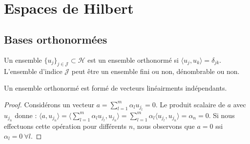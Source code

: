 \section{Espaces de Hilbert}


\subsection{Bases orthonormées}

\begin{definition}
    Un ensemble $\{u_j\}_{j\in\mathcal{J}}\subset\mathcal{H}$ est un ensemble orthonormé si $\langle u_j,u_k \rangle = \delta_{jk}$. L'ensemble d'indice $\mathcal{J}$ peut être un ensemble fini ou non, dénombrable ou non.
    
    Un ensemble orthonormé est formé de vecteurs linéairments indépendants.
\end{definition}
\begin{proof}
    Considérons un vecteur $a = \sum \limits_{l=1}^m \alpha_lu_{j_l} = 0$. Le produit scalaire de $a$ avec $u_{j_n}$ donne : $\langle a,u_{j_n} \rangle = \langle \sum \limits_{l=1}^m \alpha_lu_{j_l}, u_{j_n} \rangle = \sum \limits_{l=1}^m \alpha_l \langle u_{j_l},u_{j_n} \rangle = \alpha_n = 0$. Si nous effectuons cette opération pour différents $n$, nous observons que $a = 0$ ssi $\alpha_l = 0 \ \forall l$.
\end{proof}

